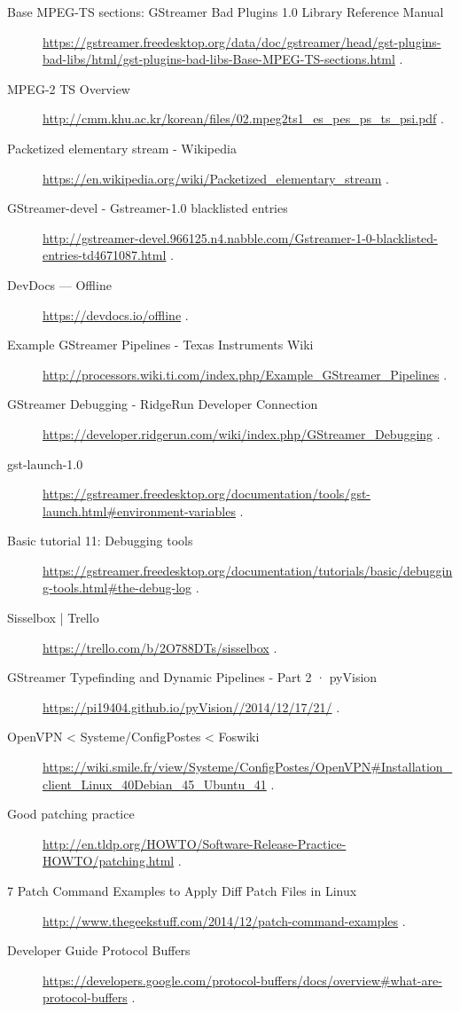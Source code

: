 \begin{description}
\item [Base MPEG-TS sections: GStreamer Bad Plugins 1.0 Library Reference Manual] \url{https://gstreamer.freedesktop.org/data/doc/gstreamer/head/gst-plugins-bad-libs/html/gst-plugins-bad-libs-Base-MPEG-TS-sections.html} . 
\item [MPEG-2 TS Overview] \url{http://cmm.khu.ac.kr/korean/files/02.mpeg2ts1_es_pes_ps_ts_psi.pdf} . 
\item [Packetized elementary stream - Wikipedia] \url{https://en.wikipedia.org/wiki/Packetized_elementary_stream} . 
\item [GStreamer-devel - Gstreamer-1.0 blacklisted entries] \url{http://gstreamer-devel.966125.n4.nabble.com/Gstreamer-1-0-blacklisted-entries-td4671087.html} . 
\item [DevDocs — Offline] \url{https://devdocs.io/offline} . 
\item [Example GStreamer Pipelines - Texas Instruments Wiki] \url{http://processors.wiki.ti.com/index.php/Example_GStreamer_Pipelines} . 
\item [GStreamer Debugging - RidgeRun Developer Connection] \url{https://developer.ridgerun.com/wiki/index.php/GStreamer_Debugging} . 
\item [gst-launch-1.0] \url{https://gstreamer.freedesktop.org/documentation/tools/gst-launch.html#environment-variables} . 
\item [Basic tutorial 11: Debugging tools] \url{https://gstreamer.freedesktop.org/documentation/tutorials/basic/debugging-tools.html#the-debug-log} . 
\item [Sisselbox | Trello] \url{https://trello.com/b/2O788DTs/sisselbox} . 
\item [GStreamer Typefinding and Dynamic Pipelines - Part 2 · pyVision] \url{https://pi19404.github.io/pyVision//2014/12/17/21/} . 
\item [OpenVPN < Systeme/ConfigPostes < Foswiki] \url{https://wiki.smile.fr/view/Systeme/ConfigPostes/OpenVPN#Installation_client_Linux_40Debian_45_Ubuntu_41} . 
\item [Good patching practice] \url{http://en.tldp.org/HOWTO/Software-Release-Practice-HOWTO/patching.html} . 
\item [7 Patch Command Examples to Apply Diff Patch Files in Linux] \url{http://www.thegeekstuff.com/2014/12/patch-command-examples} .
\item [Developer Guide Protocol Buffers] \url{https://developers.google.com/protocol-buffers/docs/overview#what-are-protocol-buffers} .

\end{description}